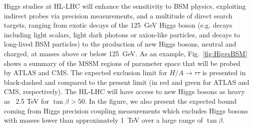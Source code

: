 \documentclass[../report.tex]{subfiles}
\begin{document}
Higgs studies at HL-LHC will enhance the sensitivity to BSM physics, exploiting indirect probes via precision measurements, and a multitude of direct search targets, ranging from exotic decays of the 125~GeV Higgs boson (e.g. decays including light scalars, light dark photons or axion-like particles, and decays to long-lived BSM particles) to the production of new Higgs bosons, neutral and charged, at masses above or below 125~GeV.
As an example, Fig.~\ref{fig:HiggsBSM} shows a summary of the MSSM regions of parameter space that will be probed by ATLAS and CMS. The expected exclusion limit for $H/A\to \tau \tau$ is presented in black-dashed and compared to the present limit (in red and green for ATLAS and CMS, respectively). The HL-LHC will have access to new Higgs bosons as heavy as ~2.5 TeV for $\tan\beta>50$. In the figure, we also present the expected bound coming from  Higgs precision coupling measurements which excludes Higgs bosons with masses lower than approximately 1~TeV over a large range of $\tan\beta$.
\end{document}
